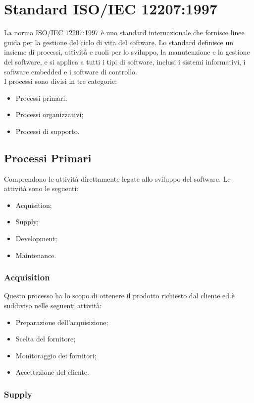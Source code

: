 \section{Standard ISO/IEC 12207:1997}
La norma ISO/IEC 12207:1997 è uno standard internazionale che fornisce linee guida per la gestione del ciclo di vita del software. Lo standard definisce un insieme di processi, attività e ruoli per lo sviluppo, la manutenzione e la gestione del software, e si applica a tutti i tipi di software, inclusi i sistemi informativi, i software embedded e i software di controllo.\\
I processi sono divisi in tre categorie:
\begin{itemize}
\item Processi primari;
\item Processi organizzativi;
\item Processi di supporto.
\end{itemize}

\subsection{Processi Primari}
Comprendono le attività direttamente legate allo sviluppo del software.
Le attività sono le seguenti:
\begin{itemize}
\item Acquisition;
\item Supply;
\item Development;
\item Maintenance.
\end{itemize}

\subsubsection{Acquisition}
Questo processo ha lo scopo di ottenere il prodotto richiesto dal cliente ed è suddiviso nelle seguenti
attività:
\begin{itemize}
    \item Preparazione dell’acquisizione;
    \item Scelta del fornitore;
    \item Monitoraggio dei fornitori;
    \item Accettazione del cliente.
\end{itemize}

\subsubsection{Supply}

